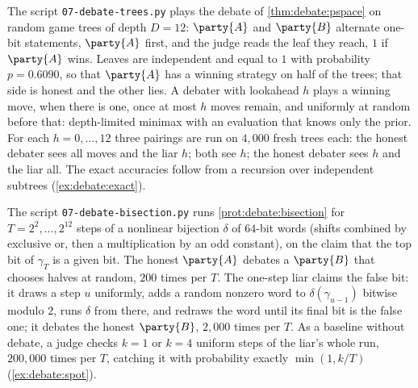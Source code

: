 \begin{refsection}
The script \texttt{07-debate-trees.py} plays the debate of \cref{thm:debate:pspace} on random game trees of depth $D=12$: $\party{A}$ and $\party{B}$ alternate one-bit statements, $\party{A}$ first, and the judge reads the leaf they reach, $1$ if $\party{A}$ wins. Leaves are independent and equal to $1$ with probability $p=0.6090$, so that $\party{A}$ has a winning strategy on half of the trees; that side is honest and the other lies. A debater with lookahead $h$ plays a winning move, when there is one, once at most $h$ moves remain, and uniformly at random before that: depth-limited minimax with an evaluation that knows only the prior. For each $h=0,\dots,12$ three pairings are run on $4{,}000$ fresh trees each: the honest debater sees all moves and the liar $h$; both see $h$; the honest debater sees $h$ and the liar all. The exact accuracies follow from a recursion over independent subtrees (\cref{ex:debate:exact}).

The script \texttt{07-debate-bisection.py} runs \cref{prot:debate:bisection} for $T=2^2,\dots,2^{12}$ steps of a nonlinear bijection $\delta$ of $64$-bit words (shifts combined by exclusive or, then a multiplication by an odd constant), on the claim that the top bit of $\gamma_T$ is a given bit. The honest $\party{A}$ debates a $\party{B}$ that chooses halves at random, $200$ times per $T$. The one-step liar claims the false bit: it draws a step $u$ uniformly, adds a random nonzero word to $\delta(\gamma_{u-1})$ bitwise modulo $2$, runs $\delta$ from there, and redraws the word until its final bit is the false one; it debates the honest $\party{B}$, $2{,}000$ times per $T$. As a baseline without debate, a judge checks $k=1$ or $k=4$ uniform steps of the liar's whole run, $200{,}000$ times per $T$, catching it with probability exactly $\min(1,k/T)$ (\cref{ex:debate:spot}).


\end{refsection}
